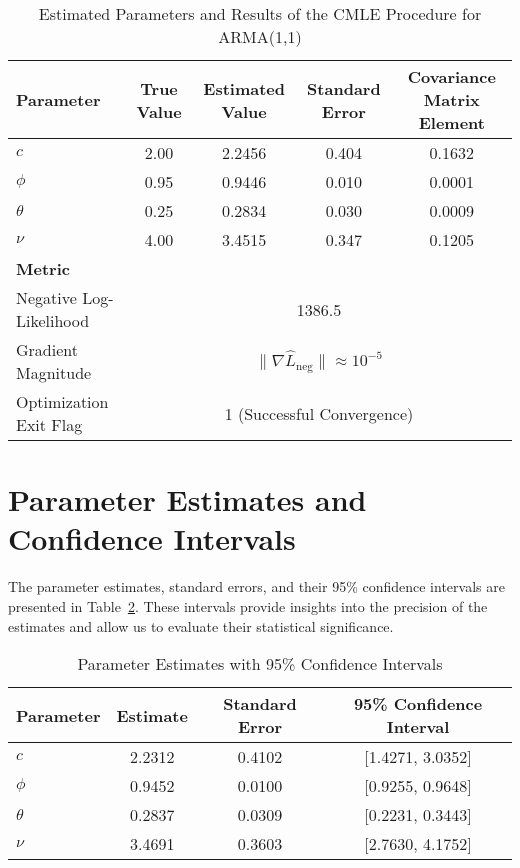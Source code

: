 \documentclass[a4paper,12pt]{article}
\begin{document}
\begin{table}[h!]
\centering
\caption{Estimated Parameters and Results of the CMLE Procedure for ARMA(1,1)}
\label{tab:results2}
\begin{tabular}{@{}lcccc@{}}
\toprule
\textbf{Parameter} & \textbf{True Value} & \textbf{Estimated Value} & \textbf{Standard Error} & \textbf{Covariance Matrix Element} \\ \midrule
$c$      & 2.00     & 2.2456   & 0.404      & 0.1632  \\
$\phi$   & 0.95     & 0.9446   & 0.010      & 0.0001  \\
$\theta$ & 0.25     & 0.2834   & 0.030      & 0.0009  \\
$\nu$    & 4.00     & 3.4515   & 0.347      & 0.1205  \\ \midrule
\textbf{Metric} & \multicolumn{4}{c}{} \\ \midrule
Negative Log-Likelihood & \multicolumn{4}{c}{1386.5} \\
Gradient Magnitude      & \multicolumn{4}{c}{$\|\nabla \hat{L}_{\text{neg}}\| \approx 10^{-5}$} \\
Optimization Exit Flag  & \multicolumn{4}{c}{1 (Successful Convergence)} \\ \bottomrule
\end{tabular}
\end{table}



\section{Parameter Estimates and Confidence Intervals}

The parameter estimates, standard errors, and their 95\% confidence intervals are presented in Table~\ref{tab:ci_results}. These intervals provide insights into the precision of the estimates and allow us to evaluate their statistical significance.

\begin{table}[h!]
\centering
\caption{Parameter Estimates with 95\% Confidence Intervals}
\label{tab:ci_results}
\begin{tabular}{@{}lccc@{}}
\toprule
\textbf{Parameter} & \textbf{Estimate} & \textbf{Standard Error} & \textbf{95\% Confidence Interval} \\ \midrule
$c$      & 2.2312  & 0.4102  & [1.4271, 3.0352] \\
$\phi$   & 0.9452  & 0.0100  & [0.9255, 0.9648] \\
$\theta$ & 0.2837  & 0.0309  & [0.2231, 0.3443] \\
$\nu$    & 3.4691  & 0.3603  & [2.7630, 4.1752] \\ \bottomrule
\end{tabular}
\end{table}
\end{document}
